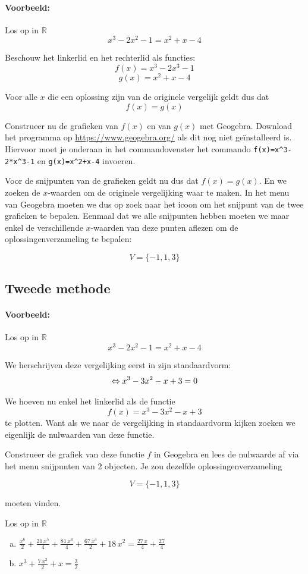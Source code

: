 \documentclass[12pt]{article}
\begin{document}
\paragraph*{Voorbeeld:} Los op in $\mathbb{R}$
$$x^3-2x^2-1=x^2+x-4$$

Beschouw het linkerlid en het rechterlid als functies:
$$f(x)=x^3-2x^3-1$$
$$g(x)=x^2+x-4$$

Voor alle $x$ die een oplossing zijn van de originele vergelijk geldt dus dat
$$f(x)=g(x)$$

Construeer nu de grafieken van $f(x)$ en van $g(x)$ met Geogebra. Download het programma op \url{https://www.geogebra.org/} als dit nog niet geïnstalleerd is. Hiervoor moet je onderaan in het commandovenster het commando \verb#f(x)=x^3-2*x^3-1# en \verb#g(x)=x^2+x-4# invoeren.

Voor de snijpunten van de grafieken geldt nu dus dat $f(x)=g(x)$. En we zoeken de $x$-waarden om de originele vergelijking waar te maken. In het menu van Geogebra moeten we dus op zoek naar het icoon om het snijpunt van de twee grafieken te bepalen. Eenmaal dat we alle snijpunten hebben moeten we maar enkel de verschillende $x$-waarden van deze punten aflezen om de oplossingenverzameling te bepalen:

$$V=\{-1, 1, 3\}$$

\subsection*{Tweede methode}

\paragraph*{Voorbeeld:} Los op in $\mathbb{R}$
$$x^3-2x^2-1=x^2+x-4$$

We herschrijven deze vergelijking eerst in zijn standaardvorm:
$$\Leftrightarrow x^3-3x^2-x + 3=0$$

We hoeven nu enkel het linkerlid als de functie
$$f(x)=x^3-3x^2-x + 3$$
te plotten. Want als we naar de vergelijking in standaardvorm kijken zoeken we eigenlijk de nulwaarden van deze functie.

Construeer de grafiek van deze functie $f$ in Geogebra en lees de nulwaarde af via het menu snijpunten van 2 objecten. Je zou dezelfde oplossingenverzameling

$$V=\{-1, 1, 3\}$$

moeten vinden.



\begin{oefening}
  Los op in $\mathbb{R}$\\
  \begin{enumerate}[(a)]
    \itemsep2em
  \item $\displaystyle\frac{{x}^{6}}{2}+\frac{21\,{x}^{5}}{4}+\frac{81\,{x}^{4}}{4}+\frac{67\,{x}^{3}}{2}+18\,{x}^{2}=\frac{27\,x}{4}+\frac{27}{4}$
  \item $\displaystyle{x}^{3}+\frac{7\,{x}^{2}}{2}+x=\frac{3}{2}$
  \end{enumerate}
\end{oefening}
\end{document}
